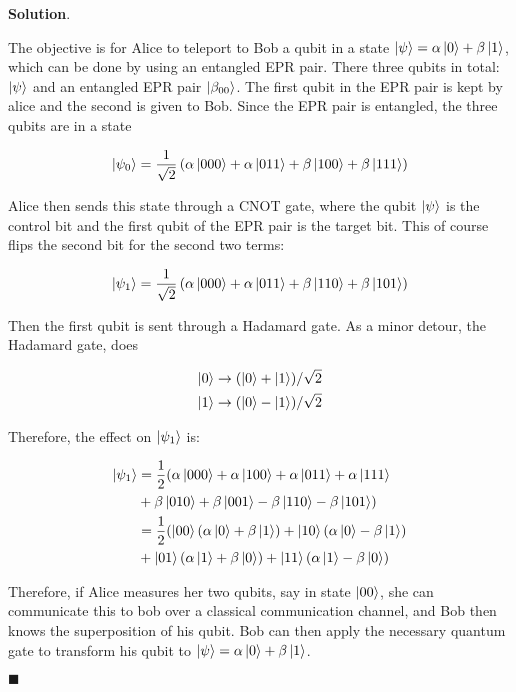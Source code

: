 \documentclass[12pt]{article}
\theoremstyle{definition}
\newenvironment{s}{%
        \begin{trivlist} \item \textbf{Solution}. }{%
            \hspace*{\fill} $\blacksquare$\end{trivlist}}%
\begin{document}
{\begin{s}

The objective is for Alice to teleport to Bob a qubit in a state $\ket{\psi} = \alpha\ket{0} + \beta\ket{1}$, which can be done by using an entangled EPR pair. There three qubits in total: $\ket{\psi}$ and an entangled EPR pair $\ket{\beta_{00}}$. The first qubit in the EPR pair is kept by alice and the second is given to Bob. Since the EPR pair is entangled, the three qubits are in a state

\begin{equation*}
\ket{\psi_{0}} = \frac{1}{\sqrt{2}}\left(\alpha\ket{000} + \alpha\ket{011} + \beta\ket{100} + \beta\ket{111}\right)
\end{equation*}

Alice then sends this state through a CNOT gate, where the qubit $\ket{\psi}$ is the control bit and the first qubit of the EPR pair is the target bit. This of course flips the second bit for the second two terms:

\begin{equation*}
\ket{\psi_{1}} = \frac{1}{\sqrt{2}}\left(\alpha\ket{000} + \alpha\ket{011} + \beta\ket{110} + \beta\ket{101}\right)
\end{equation*}

Then the first qubit is sent through a Hadamard gate. As a minor detour, the Hadamard gate, does

\begin{align*}
\ket{0} &\rightarrow (\ket{0} + \ket{1})/\sqrt{2}\\
\ket{1} &\rightarrow (\ket{0} - \ket{1})/\sqrt{2}
\end{align*}

Therefore, the effect on $\ket{\psi_1}$ is:


\begin{align*}
\ket{\psi_{1}} &= \frac{1}{2}(\alpha\ket{000} + \alpha\ket{100} + \alpha\ket{011} + \alpha\ket{111}\\
&+ \beta\ket{010} + \beta\ket{001} - \beta\ket{110} - \beta\ket{101})\\
&= \frac{1}{2}(\ket{00}(\alpha\ket{0} + \beta\ket{1}) + \ket{10}(\alpha\ket{0} - \beta\ket{1})\\
&+ \ket{01}(\alpha\ket{1} + \beta\ket{0}) + \ket{11}(\alpha\ket{1} - \beta\ket{0})
\end{align*}

Therefore, if Alice measures her two qubits, say in state $\ket{00}$, she can communicate this to bob over a classical communication channel, and Bob then knows the superposition of his qubit. Bob can then apply the necessary quantum gate to transform his qubit to $\ket{\psi} = \alpha\ket{0} + \beta\ket{1}$.


\end{s}}
\end{document}
